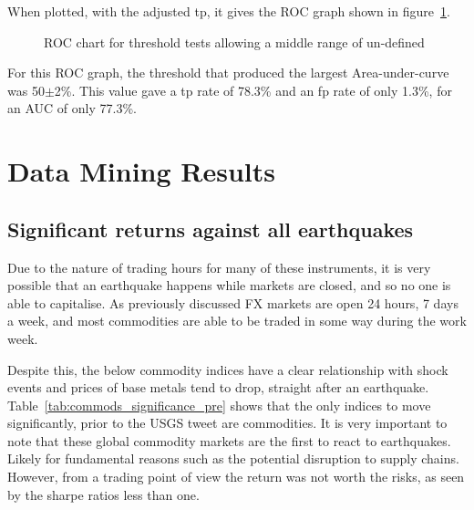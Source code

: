 When plotted, with the adjusted tp, it gives the ROC graph shown in figure~\ref{fig:threshold_adj}.

\begin{figure}[H]
    \centering
    \caption{ROC chart for threshold tests allowing a middle range of un-defined}
    \label{fig:threshold_adj}
\end{figure}

For this ROC graph, the threshold that produced the largest Area-under-curve was 50$\pm$2\%. This value gave a tp rate of 78.3\% and an fp rate of only 1.3\%, for an AUC of only 77.3\%.

\pagebreak
\section{Data Mining Results}

\subsection{Significant returns against all earthquakes}

Due to the nature of trading hours for many of these instruments, it is very possible that an earthquake happens while markets are closed, and so no one is able to capitalise. As previously discussed FX markets are open 24 hours, 7 days a week, and most commodities are able to be traded in some way during the work week.

Despite this, the below commodity indices have a clear relationship with shock events and prices of base metals tend to drop, straight after an earthquake. Table~\ref{tab:commods_significance_pre} shows that the only indices to move significantly, prior to the USGS tweet are commodities. It is very important to note that these global commodity markets are the first to react to earthquakes. Likely for fundamental reasons such as the potential disruption to supply chains. However, from a trading point of view the return was not worth the risks, as seen by the sharpe ratios less than one.


